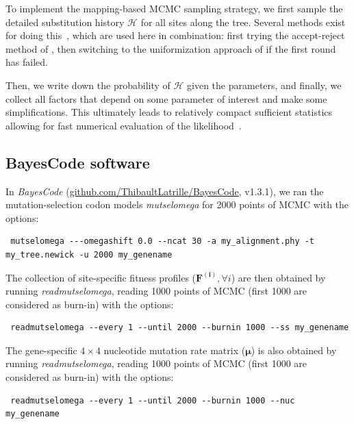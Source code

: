 \documentclass{article}
\newcommand{\UniDimArray}[1]{\bm{#1}}
\newcommand{\subhistory}{\mathcal{H}}
\begin{document}
    To implement the mapping-based {MCMC} sampling strategy, we first sample the detailed {substitution} history $\subhistory$ for all sites along the tree.
    Several methods exist for doing this~\cite{nielsen_mapping_2002,rodrigue_uniformization_2008}, which are used here in combination: first trying the accept-reject method of \textcite{nielsen_mapping_2002}, then switching to the uniformization approach of \textcite{rodrigue_uniformization_2008} if the first round has failed.

    Then, we write down the probability of $\subhistory$ given the parameters, and finally, we collect all factors that depend on some parameter of interest and make some simplifications.
    This ultimately leads to relatively compact sufficient statistics allowing for fast numerical evaluation of the likelihood~\cite{irvahn_phylogenetic_2014,davydov_state_2017}.

    \subsection{BayesCode software}\label{subsec:bayescode}
    In \textit{BayesCode} (\href{https://github.com/ThibaultLatrille/BayesCode}{github.com/ThibaultLatrille/BayesCode}, v1.3.1), we ran the mutation-selection codon models \textit{mutselomega} for 2000 points of MCMC with the options:
    \begin{scriptsize}
        \begin{verbatim}
 mutselomega ---omegashift 0.0 --ncat 30 -a my_alignment.phy -t my_tree.newick -u 2000 my_genename
        \end{verbatim}
    \end{scriptsize}
    The collection of site-specific fitness profiles ($\UniDimArray{F^{(i)}}, \forall i$) are then obtained by running \textit{readmutselomega}, reading 1000 points of MCMC (first 1000 are considered as burn-in) with the options:
    \begin{scriptsize}
        \begin{verbatim}
 readmutselomega --every 1 --until 2000 --burnin 1000 --ss my_genename
        \end{verbatim}
    \end{scriptsize}
    The gene-specific $4 \times 4$ nucleotide mutation rate matrix ($\UniDimArray{\mu}$) is also obtained by running \textit{readmutselomega}, reading 1000 points of MCMC (first 1000 are considered as burn-in) with the options:
    \begin{scriptsize}
        \begin{verbatim}
 readmutselomega --every 1 --until 2000 --burnin 1000 --nuc my_genename
        \end{verbatim}
    \end{scriptsize}
\end{document}
